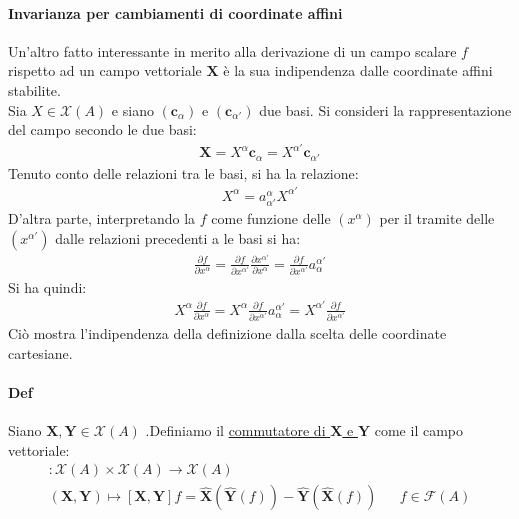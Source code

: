 \documentclass[10pt,a4paper]{book}
\begin{document}
    \paragraph{Invarianza per cambiamenti di coordinate affini} Un'altro fatto interessante in merito alla derivazione di un campo scalare $f$ rispetto ad un campo vettoriale $\mathbf{X}$ è la sua indipendenza dalle coordinate affini stabilite.\\
    Sia $X\in \mathcal{X}(A)$ e siano $(\mathbf{c}_\alpha)$ e $(\mathbf{c}_{\alpha'})$ due basi. Si consideri la rappresentazione del campo secondo le due basi:
    \begin{align*}
        \mathbf{X}=X^\alpha\mathbf{c}_\alpha =X^{\alpha'}\mathbf{c}_{\alpha'}
    \end{align*}
    Tenuto conto delle relazioni tra le basi, si ha la relazione:
    \begin{align*}
        X^\alpha=a^\alpha_{\alpha'}X^{\alpha'}
    \end{align*}
    D'altra parte, interpretando la $f$ come funzione delle $(x^\alpha)$ per il tramite delle $(x^{\alpha'})$ dalle relazioni precedenti a le basi si ha:
    \begin{align*}
        \frac{\partial f}{\partial x^\alpha}=\frac{\partial f}{\partial x^{\alpha'}}\frac{\partial x^{\alpha'} }{\partial x^\alpha}=\frac{\partial f}{\partial x^{\alpha '}}a^{\alpha'}_\alpha
    \end{align*}
    Si ha quindi:
    \begin{align*}
        X^\alpha\frac{\partial f}{\partial x^\alpha}=X^\alpha\frac{\partial f}{\partial x^{\alpha'}}a^{\alpha'}_\alpha= X^{\alpha'}\frac{\partial f}{\partial x^{\alpha'}}
    \end{align*}
    Ciò mostra l'indipendenza della definizione dalla scelta delle coordinate cartesiane.
    \paragraph{Def} Siano $\mathbf{X},\mathbf{Y}\in \mathcal{X}(A)$ .Definiamo il \underline{commutatore di $\mathbf{X}$ e $\mathbf{Y}$} come il campo vettoriale:
    \begin{align*}
    [\cdot,\cdot]\colon \mathcal{X}(A)\times \mathcal{X}(A)\to \mathcal{X}(A)\\
        (\mathbf{X},\mathbf{Y})\mapsto[\mathbf{X},\mathbf{Y}]f=\hat{\mathbf{X}}(\hat{\mathbf{Y}}(f))-\hat{\mathbf{Y}}(\hat{\mathbf{X}}(f)) && f\in \mathcal{F}(A)
    \end{align*}
\end{document}
